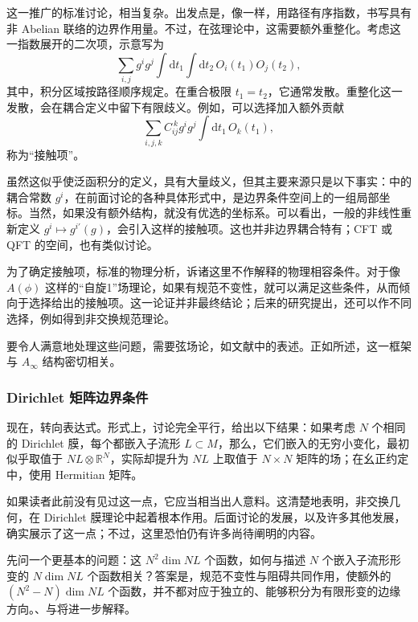 这一推广的标准讨论，相当复杂。出发点是，像一样，用路径有序指数，书写具有非 Abelian 联络的边界作用量。不过，在弦理论中，这需要额外重整化。考虑这一指数展开的二次项，示意写为
\[
\sum_{i,j}g^ig^j\int\mathrm{d}t_1\int\mathrm{d}t_2\,
O_i(t_1)O_j(t_2),
\]
其中，积分区域按路径顺序规定。在重合极限 $t_1=t_2$，它通常发散。重整化这一发散，会在耦合定义中留下有限歧义。例如，可以选择加入额外贡献
\[
\sum_{i,j,k}C_{ij}^{\ k}g^ig^j
\int\mathrm{d}t_1\,O_k(t_1),
\]
称为“接触项”。

虽然这似乎使泛函积分的定义，具有大量歧义，但其主要来源只是以下事实：中的耦合常数 $g^i$，在前面讨论的各种具体形式中，是边界条件空间上的一组局部坐标。当然，如果没有额外结构，就没有优选的坐标系。可以看出，一般的非线性重新定义 $g^i\mapsto g^{i\prime}(g)$，会引入这样的接触项。这也并非边界耦合特有；CFT 或 QFT 的空间，也有类似讨论。

为了确定接触项，标准的物理分析，诉诸这里不作解释的物理相容条件。对于像 $A(\phi)$ 这样的“自旋1”场理论，如果有规范不变性，就可以满足这些条件，从而倾向于选择给出的接触项。这一论证并非最终结论；后来的研究提出，还可以作不同选择，例如得到非交换规范理论。

要令人满意地处理这些问题，需要弦场论，如文献中的表述。正如所述，这一框架与 $A_\infty$ 结构密切相关。

\subsubsection{Dirichlet 矩阵边界条件}\label{sec:3.5.2.9}

现在，转向表达式。形式上，讨论完全平行，给出以下结果：如果考虑 $N$ 个相同的 Dirichlet 膜，每个都嵌入子流形 $L\subset M$，那么，它们嵌入的无穷小变化，最初似乎取值于 $NL\otimes\mathbb{R}^N$，实际却提升为 $NL$ 上取值于 $N\times N$ 矩阵的场；在幺正约定中，使用 Hermitian 矩阵。

如果读者此前没有见过这一点，它应当相当出人意料。这清楚地表明，非交换几何，在 Dirichlet 膜理论中起着根本作用。后面讨论的发展，以及许多其他发展，确实展示了这一点；不过，这里恐怕仍有许多尚待阐明的内容。

先问一个更基本的问题：这 $N^2\dim NL$ 个函数，如何与描述 $N$ 个嵌入子流形形变的 $N\dim NL$ 个函数相关？答案是，规范不变性与阻碍共同作用，使额外的 $(N^2-N)\dim NL$ 个函数，并不都对应于独立的、能够积分为有限形变的边缘方向。、与将进一步解释。

